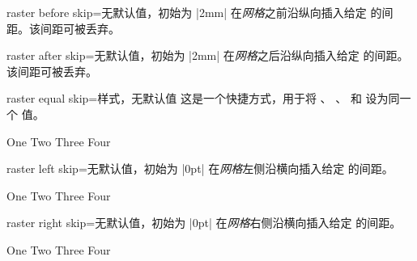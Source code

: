 \begin{docTcbKey}[][doc new and updated={2014-11-10}{2014-12-16}]{raster before skip}{=}{无默认值，初始为 |2mm|}
  在\emph{网格}之前沿纵向插入给定  的间距。该间距可被丢弃。
\end{docTcbKey}

\begin{docTcbKey}[][doc new and updated={2014-11-10}{2014-12-16}]{raster after skip}{=}{无默认值，初始为 |2mm|}
  在\emph{网格}之后沿纵向插入给定  的间距。该间距可被丢弃。
\end{docTcbKey}


\begin{docTcbKey}[][doc new=2015-01-08]{raster equal skip}{=}{样式，无默认值}
  这是一个快捷方式，用于将
  、
  、
   和
  设为同一个  值。
\begin{dispExample}
\begin{tcbitemize}[raster equal skip=4mm,
  size=small,colframe=red!50!black,colback=red!10!white]
  \tcbitem One
  \tcbitem Two
  \tcbitem Three
  \tcbitem Four
\end{tcbitemize}
\end{dispExample}
\end{docTcbKey}


\clearpage

\begin{docTcbKey}[][doc new=2014-11-10]{raster left skip}{=}{无默认值，初始为 |0pt|}
  在\emph{网格}左侧沿横向插入给定  的间距。
\begin{dispExample}
\begin{tcbitemize}[raster left skip=2cm,
  size=small,colframe=red!50!black,colback=red!10!white]
  \tcbitem One
  \tcbitem Two
  \tcbitem Three
  \tcbitem Four
\end{tcbitemize}
\end{dispExample}
\end{docTcbKey}


\begin{docTcbKey}[][doc new=2014-11-10]{raster right skip}{=}{无默认值，初始为 |0pt|}
  在\emph{网格}右侧沿横向插入给定  的间距。
\begin{dispExample}
\begin{tcbitemize}[raster right skip=2cm,
  size=small,colframe=red!50!black,colback=red!10!white]
  \tcbitem One
  \tcbitem Two
  \tcbitem Three
  \tcbitem Four
\end{tcbitemize}
\end{dispExample}
\end{docTcbKey}

